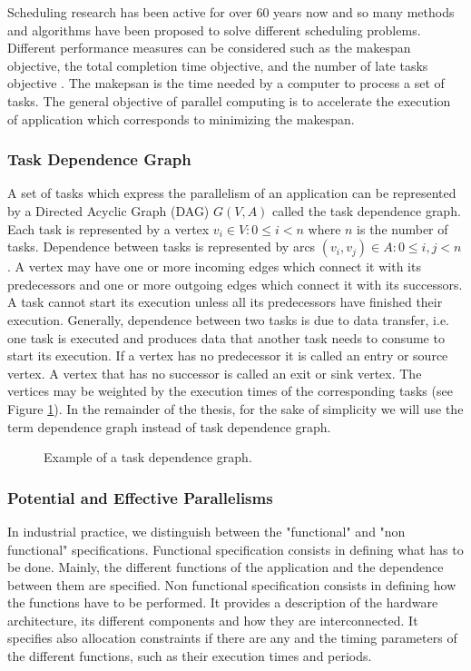 Scheduling research has been active for over 60 years now and so many methods and algorithms have been proposed to solve different scheduling problems. Different performance measures can be considered such as the makespan objective, the total completion time objective, and the number of late tasks objective \cite{leung:2004}. The makepsan is the time needed by a computer to process a set of tasks. The general objective of parallel computing is to accelerate the execution of application which corresponds to minimizing the makespan.

\subsubsection{Task Dependence Graph}

A set of tasks which express the parallelism of an application can be represented by a Directed Acyclic Graph (DAG) $G(V,A)$ called the task dependence graph. Each task is represented by a vertex $v_i \in V: 0 \leq i < n$ where $n$ is the number of tasks. Dependence between tasks is represented by arcs $(v_i, v_j) \in A: 0 \leq i,j < n$. A vertex may have one or more incoming edges which connect it with its predecessors and one or more outgoing edges which connect it with its successors. A task cannot start its execution unless all its predecessors have finished their execution. Generally, dependence between two tasks is due to data transfer, i.e. one task is executed and produces data that another task needs to consume to start its execution. If a vertex has no predecessor it is called an entry or source vertex. A vertex that has no successor is called an exit or sink vertex. The vertices may be weighted by the execution times of the corresponding tasks (see Figure \ref{fig:dagex}). In the remainder of the thesis, for the sake of simplicity we will use the term dependence graph instead of task dependence graph.

\begin{figure}[phbt]
\centering

\caption{Example of a task dependence graph.}
\label{fig:dagex}
\end{figure} 

\subsubsection{Potential and Effective Parallelisms}

In industrial practice, we distinguish between the "functional" and "non functional" specifications. Functional specification consists in defining what has to be done. Mainly, the different functions of the application and the dependence between them are specified. Non functional specification consists in defining how the functions have to be performed. It provides a description of the hardware architecture, its different components and how they are interconnected. It specifies also allocation constraints if there are any and the timing parameters of the different functions, such as their execution times and periods.

